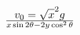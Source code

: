 \documentclass[preview]{standalone}
\begin{document}
\begin{align*}
v_0 = \sqrt  x^{2}g} \over {x\sin 2\theta -2y\cos ^{2}\theta
\end{align*}
\end{document}
